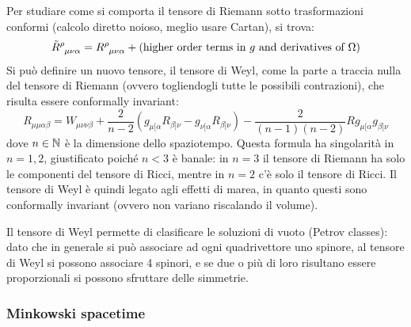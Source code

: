 Per studiare come si comporta il tensore di Riemann sotto trasformazioni conformi (calcolo diretto noioso, meglio usare Cartan), si trova:
\begin{equation*}
  \tensor{\tilde{R}}{^\rho_{\mu \nu \alpha}} = \tensor{R}{^\rho_{\mu \nu \alpha}} + (\text{higher order terms in $ g $ and derivatives of $ \Omega $})
\end{equation*}
Si può definire un nuovo tensore, il tensore di Weyl, come la parte a traccia nulla del tensore di Riemann (ovvero togliendogli tutte le possibili contrazioni), che risulta essere conformally invariant:
\begin{equation*}
  R_{\mu \mu \alpha \beta} = W_{\mu \nu \nu \beta} + \frac{2}{n-2} \left( g_{\mu [\alpha} R_{\beta] \nu} - g_{\nu [\alpha} R_{\beta] \nu} \right) - \frac{2}{(n-1)(n-2)} R g_{\mu [\alpha} g_{\beta] \nu}
\end{equation*}
dove $ n \in \mathbb{N} $ è la dimensione dello spaziotempo. Questa formula ha singolarità in $ n = 1 , 2 $, giustificato poiché $ n < 3 $ è banale: in $ n = 3 $ il tensore di Riemann ha solo le componenti del tensore di Ricci, mentre in $ n = 2 $ c'è solo il tensore di Ricci. Il tensore di Weyl è quindi legato agli effetti di marea, in quanto questi sono conformally invariant (ovvero non variano riscalando il volume).

Il tensore di Weyl permette di clasificare le soluzioni di vuoto (Petrov classes): dato che in generale si può associare ad ogni quadrivettore uno spinore, al tensore di Weyl si possono associare 4 spinori, e se due o più di loro risultano essere proporzionali si possono sfruttare delle simmetrie.

\subsubsection{Minkowski spacetime}

